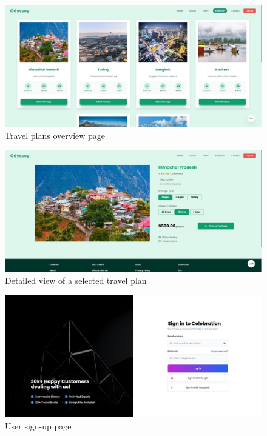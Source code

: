 \documentclass{scrreprt}
\begin{document}
\begin{figure}[h!]
    \centering
    \includegraphics[width=1.1\textwidth, height=0.4\textheight]{./SS/plans.jpg}
    \caption{Travel plans overview page}
    \label{fig:plans}
\end{figure}

\begin{figure}[h!]
    \centering
    \includegraphics[width=1.1\textwidth, height=0.4\textheight]{./SS/plan.jpg}
    \caption{Detailed view of a selected travel plan}
    \label{fig:plan}
\end{figure}

\begin{figure}[h!]
    \centering
    \includegraphics[width=1.1\textwidth, height=0.4\textheight]{./SS/signup.jpg}
    \caption{User sign-up page}
    \label{fig:signup}
\end{figure}
\end{document}
